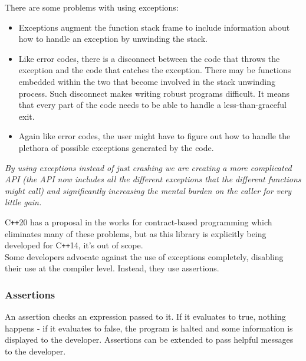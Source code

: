 \documentclass[12pt]{report}
\newcommand{\citenoparen}[1]{\citeauthor{#1} \citeyear{#1}}
\newcommand{\cpp}{C\texttt{++}}
\newcommand{\quotebu}[2]
{
  \begin{displayquote}[\citenoparen{#2}]
    \textit{#1}
  \end{displayquote}
}
\theoremstyle{definition}
\begin{document}
          There are some problems with using exceptions:

          \begin{itemize}
            \item Exceptions augment the function stack frame to include
              information about how to handle an exception by unwinding the stack.
            \item Like error codes, there is a disconnect between the code
              that throws the exception and the code that catches the exception.
              There may be functions embedded within the two that become
              involved in the stack unwinding process. Such disconnect makes
              writing robust programs difficult. It means that every part of
              the code needs to be able to handle a less-than-graceful exit.
            \item Again like error codes, the user might have to figure out
              how to handle the plethora of possible exceptions generated by
              the code.
          \end{itemize}

          \quotebu{
            By using exceptions instead of just crashing we are creating a more
            complicated API (the API now includes all the different exceptions
            that the different functions might call) and significantly
            increasing the mental burden on the caller for very little gain.
          }{gamasutra}

          \cpp20 has a proposal in the works for contract-based programming
          which eliminates many of these problems, but as this library is
          explicitly being developed for \cpp14, it's out of scope. \\

          Some developers advocate against the use of exceptions completely,
          disabling their use at the compiler level. Instead, they use
          assertions.


        \subsubsection{Assertions}

          An assertion checks an expression passed to it. If it evaluates to
          true, nothing happens - if it evaluates to false, the program is
          halted and some information is displayed to the developer.
          Assertions can be extended to pass helpful messages to the
          developer. \\
\end{document}
